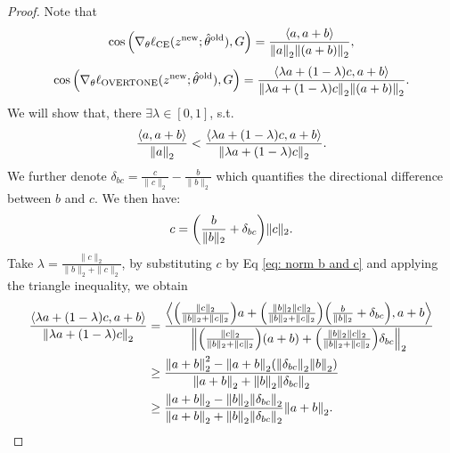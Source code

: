 \begin{proof}
Note that
\begin{equation*}
    \cos \qty( \nabla_\theta \ell_{\text{CE}} (z^{\text{new}}; \hat{\theta}^{\text{old}}), G ) = \frac{\langle a,  a + b \rangle}{\norm{a}_2 \norm{ (a + b)}_2},
\end{equation*}
\begin{equation*}
    \cos \qty( \nabla_\theta \ell_{\text{OVERTONE}} (z^{\text{new}}; \hat{\theta}^{\text{old}}), G ) = \frac{\langle \lambda a + (1 - \lambda) c,  a + b \rangle}{\norm{\lambda a + (1 - \lambda) c}_2 \norm{ (a + b)}_2}.
\end{equation*}
We will show that, there $\exists \lambda \in [0,1]$, s.t.
\begin{equation*}
    \frac{\langle a,  a + b \rangle}{\norm{a}_2} < \frac{\langle \lambda a + (1 - \lambda) c,  a + b \rangle}{\norm{\lambda a + (1 - \lambda) c}_2}.
\end{equation*}
We further denote $\delta_{bc} = \frac{c}{\|c\|_2} - \frac{b}{\|b\|_2}$ which quantifies the directional difference between $ b $ and $ c $. We then have:
\begin{equation}
\label{eq: norm b and c}
c = \qty( \frac{b}{\|b\|_2} + \delta_{bc} ) \|c\|_2.
\end{equation}
Take $\lambda = \frac{\|c\|_2}{\|b\|_2 + \|c\|_2}$, by substituting $c$ by Eq \eqref{eq: norm b and c} and applying the triangle inequality, we obtain
\begin{align*}
    \frac{\langle \lambda a + (1 - \lambda) c,  a + b \rangle}{\norm{\lambda a + (1 - \lambda) c}_2} & = \frac{\Bigl\langle 
    \qty(\frac{\|c\|_2}{\|b\|_2 + \|c\|_2}) a 
    + \qty(\frac{\|b\|_2 \|c\|_2}{\|b\|_2 + \|c\|_2}) 
    \qty( \frac{b}{\|b\|_2} + \delta_{bc} ), a + b 
    \Bigr\rangle}
    {\norm{
    \qty(\frac{\|c\|_2}{\|b\|_2 + \|c\|_2}) (a + b) 
    + \qty(\frac{\|b\|_2 \|c\|_2}{\|b\|_2 + \|c\|_2}) \delta_{bc} 
    }_2}\\
    & \geq  \frac{\norm{a + b}_2^2 - \norm{a + b}_2 \qty( \norm{\delta_{bc}}_2 \norm{b}_2 )}
    {\norm{a + b}_2 + \norm{b}_2 \norm{\delta_{bc}}_2}\\
    & \geq \frac{\norm{a + b}_2 - \norm{b}_2 \norm{\delta_{bc}}_2}
{\norm{a + b}_2 + \norm{b}_2 \norm{\delta_{bc}}_2} \norm{a + b}_2.
\end{align*}


\end{proof}
